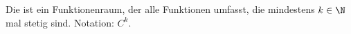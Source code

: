 Die  ist ein Funktionenraum, der alle Funktionen umfasst, die mindestens $k \in \N$ mal stetig  sind. Notation: $C^k$.